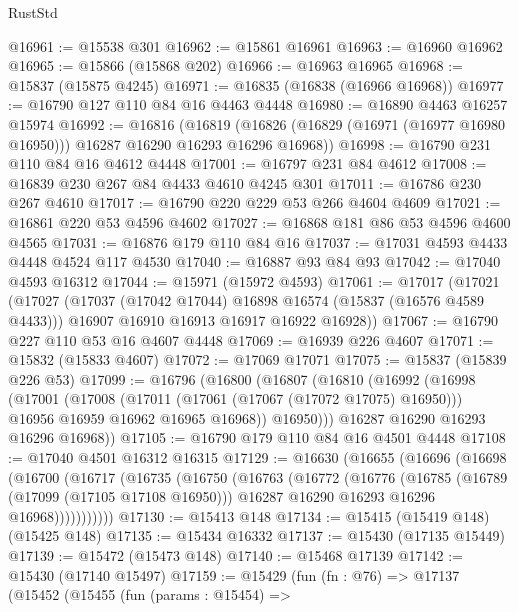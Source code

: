 \begin{lexlean}{RustStd}
\begin{coremodule}
@16961 := @15538 @301
@16962 := @15861 @16961
@16963 := @16960 @16962
@16965 := @15866 (@15868 @202)
@16966 := @16963 @16965
@16968 := @15837 (@15875 @4245)
@16971 := @16835 (@16838 (@16966 @16968))
@16977 := @16790 @127 @110 @84 @16 @4463 @4448
@16980 := @16890 @4463 @16257 @15974
@16992 := @16816
    (@16819 (@16826 (@16829 (@16971 (@16977 @16980 @16950))) @16287 @16290 @16293 @16296 @16968))
@16998 := @16790 @231 @110 @84 @16 @4612 @4448
@17001 := @16797 @231 @84 @4612
@17008 := @16839 @230 @267 @84 @4433 @4610 @4245 @301
@17011 := @16786 @230 @267 @4610
@17017 := @16790 @220 @229 @53 @266 @4604 @4609
@17021 := @16861 @220 @53 @4596 @4602
@17027 := @16868 @181 @86 @53 @4596 @4600 @4565
@17031 := @16876 @179 @110 @84 @16
@17037 := @17031 @4593 @4433 @4448 @4524 @117 @4530
@17040 := @16887 @93 @84 @93
@17042 := @17040 @4593 @16312
@17044 := @15971 (@15972 @4593)
@17061 := @17017
    (@17021
      (@17027
        (@17037 (@17042 @17044) @16898 @16574 (@15837 (@16576 @4589 @4433)))
        @16907
        @16910
        @16913
        @16917
        @16922
        @16928))
@17067 := @16790 @227 @110 @53 @16 @4607 @4448
@17069 := @16939 @226 @4607
@17071 := @15832 (@15833 @4607)
@17072 := @17069 @17071
@17075 := @15837 (@15839 @226 @53)
@17099 := @16796
    (@16800
      (@16807
        (@16810
          (@16992
            (@16998
              (@17001
                (@17008
                  (@17011 (@17061 (@17067 (@17072 @17075) @16950)))
                  @16956
                  @16959
                  @16962
                  @16965
                  @16968))
              @16950)))
        @16287
        @16290
        @16293
        @16296
        @16968))
@17105 := @16790 @179 @110 @84 @16 @4501 @4448
@17108 := @17040 @4501 @16312 @16315
@17129 := @16630
    (@16655
      (@16696
        (@16698
          (@16700
            (@16717
              (@16735
                (@16750
                  (@16763
                    (@16772
                      (@16776
                        (@16785
                          (@16789 (@17099 (@17105 @17108 @16950)))
                          @16287
                          @16290
                          @16293
                          @16296
                          @16968)))))))))))
@17130 := @15413 @148
@17134 := @15415 (@15419 @148) (@15425 @148)
@17135 := @15434 @16332
@17137 := @15430 (@17135 @15449)
@17139 := @15472 (@15473 @148)
@17140 := @15468 @17139
@17142 := @15430 (@17140 @15497)
@17159 := @15429
    (fun (fn : @76) =>
    @17137
      (@15452
        (@15455
          (fun (params : @15454) =>

\end{coremodule}
\end{lexlean}
